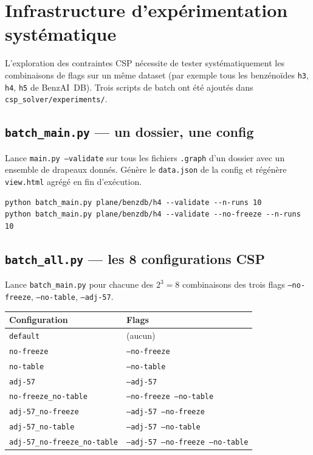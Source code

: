 \documentclass[12pt,a4paper]{article}
\theoremstyle{definition}
\begin{document}
\section{Infrastructure d'expérimentation systématique}

L'exploration des contraintes CSP nécessite de tester systématiquement les combinaisons de
flags sur un même dataset (par exemple tous les benzénoïdes \texttt{h3}, \texttt{h4},
\texttt{h5} de BenzAI~DB). Trois scripts de batch ont été ajoutés dans
\texttt{csp\_solver/experiments/}.

\subsection{\texttt{batch\_main.py} — un dossier, une config}

Lance \texttt{main.py --validate} sur tous les fichiers \texttt{.graph} d'un dossier avec un
ensemble de drapeaux donnés. Génère le \texttt{data.json} de la config et régénère
\texttt{view.html} agrégé en fin d'exécution.

\begin{lstlisting}[style=benzai]
python batch_main.py plane/benzdb/h4 --validate --n-runs 10
python batch_main.py plane/benzdb/h4 --validate --no-freeze --n-runs 10
\end{lstlisting}

\subsection{\texttt{batch\_all.py} — les 8 configurations CSP}

Lance \texttt{batch\_main.py} pour chacune des $2^3 = 8$ combinaisons des trois flags
\texttt{--no-freeze}, \texttt{--no-table}, \texttt{--adj-57}.

\begin{center}
\begin{tabular}{ll}
  \toprule
  Configuration & Flags \\
  \midrule
  \texttt{default}                       & (aucun) \\
  \texttt{no-freeze}                     & \texttt{--no-freeze} \\
  \texttt{no-table}                      & \texttt{--no-table} \\
  \texttt{adj-57}                        & \texttt{--adj-57} \\
  \texttt{no-freeze\_no-table}           & \texttt{--no-freeze --no-table} \\
  \texttt{adj-57\_no-freeze}             & \texttt{--adj-57 --no-freeze} \\
  \texttt{adj-57\_no-table}              & \texttt{--adj-57 --no-table} \\
  \texttt{adj-57\_no-freeze\_no-table}   & \texttt{--adj-57 --no-freeze --no-table} \\
  \bottomrule
\end{tabular}
\end{center}
\end{document}
